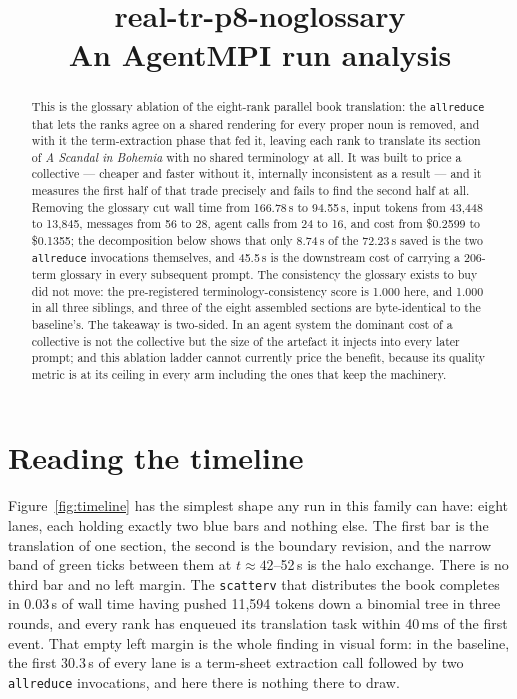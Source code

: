 \documentclass[11pt]{article}
\title{\textbf{real-tr-p8-noglossary}\\[2pt]\large An AgentMPI run analysis}
\author{}
\date{}
\begin{document}
\maketitle

\begin{abstract}
This is the glossary ablation of the eight-rank parallel book translation: the
\texttt{allreduce} that lets the ranks agree on a shared rendering for every proper noun is
removed, and with it the term-extraction phase that fed it, leaving each rank to translate its
section of \emph{A Scandal in Bohemia} with no shared terminology at all. It was built to price a
collective --- cheaper and faster without it, internally inconsistent as a result --- and it
measures the first half of that trade precisely and fails to find the second half at all. Removing
the glossary cut wall time from 166.78\,s to 94.55\,s, input tokens from 43{,}448 to 13{,}845,
messages from 56 to 28, agent calls from 24 to 16, and cost from \$0.2599 to \$0.1355; the
decomposition below shows that only 8.74\,s of the 72.23\,s saved is the two \texttt{allreduce}
invocations themselves, and 45.5\,s is the downstream cost of carrying a 206-term glossary in
every subsequent prompt. The consistency the glossary exists to buy did not move: the pre-registered
terminology-consistency score is 1.000 here, and 1.000 in all three siblings, and three of the
eight assembled sections are byte-identical to the baseline's. The takeaway is two-sided. In an
agent system the dominant cost of a collective is not the collective but the size of the artefact
it injects into every later prompt; and this ablation ladder cannot currently price the benefit,
because its quality metric is at its ceiling in every arm including the ones that keep the
machinery.
\end{abstract}



\section{Reading the timeline}

Figure~\ref{fig:timeline} has the simplest shape any run in this family can have: eight lanes,
each holding exactly two blue bars and nothing else. The first bar is the translation of one
section, the second is the boundary revision, and the narrow band of green ticks between them at
$t \approx 42$--52\,s is the halo exchange. There is no third bar and no left margin. The
\texttt{scatterv} that distributes the book completes in 0.03\,s of wall time having pushed
11{,}594 tokens down a binomial tree in three rounds, and every rank has enqueued its translation
task within 40\,ms of the first event. That empty left margin is the whole finding in visual form:
in the baseline, the first 30.3\,s of every lane is a term-sheet extraction call followed by two
\texttt{allreduce} invocations, and here there is nothing there to draw.
\end{document}
